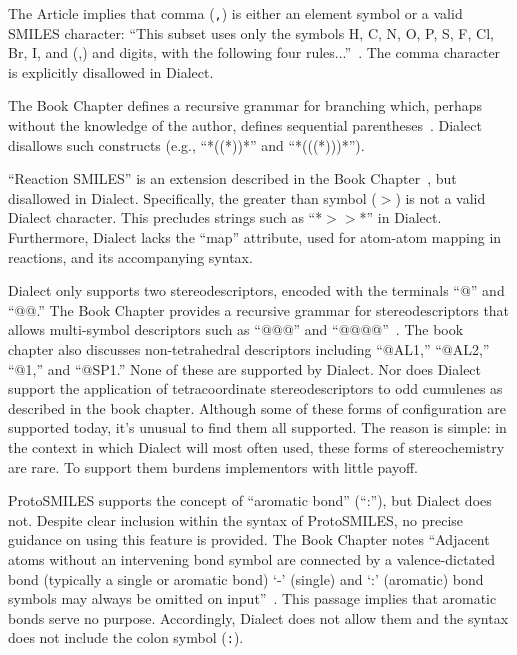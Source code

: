 \documentclass{article}
\def\ttt{\texttt}
\begin{document}
The Article implies that comma (\ttt{,}) is either an element symbol or a valid SMILES character: \enquote{This subset uses only the symbols H, C, N, O, P, S, F, Cl, Br, I, and (,) and digits, with the following four rules...}~\cite[p.~33]{weininger:1988}. The comma character is explicitly disallowed in Dialect.

The Book Chapter defines a recursive grammar for branching which, perhaps without the knowledge of the author, defines sequential parentheses~\cite[p.~86]{weininger:2003}. Dialect disallows such constructs (e.g., \enquote{*((*))*} and \enquote{*(((*)))*}).

\enquote{Reaction SMILES} is an extension described in the Book Chapter~\cite[p.~89]{weininger:2003}, but disallowed in Dialect. Specifically, the greater than symbol (\ttt{$>$}) is not a valid Dialect character. This precludes strings such as \enquote{*$>$$>$*} in Dialect. Furthermore, Dialect lacks the \enquote{map} attribute, used for atom-atom mapping in reactions, and its accompanying syntax.

Dialect only supports two stereodescriptors, encoded with the terminals \enquote{@} and \enquote{@@.} The Book Chapter provides a recursive grammar for stereodescriptors that allows multi-symbol descriptors such as \enquote{@@@} and \enquote{@@@@}~\cite[p.~94]{weininger:2003}. The book chapter also discusses non-tetrahedral descriptors including \enquote{@AL1,} \enquote{@AL2,} \enquote{@1,} and \enquote{@SP1.} None of these are supported by Dialect. Nor does Dialect support the application of tetracoordinate stereodescriptors to odd cumulenes as described in the book chapter. Although some of these forms of configuration are supported today, it's unusual to find them all supported. The reason is simple: in the context in which Dialect will most often used, these forms of stereochemistry are rare. To support them burdens implementors with little payoff.

ProtoSMILES supports the concept of \enquote{aromatic bond} (\enquote{:}), but Dialect does not. Despite clear inclusion within the syntax of ProtoSMILES, no precise guidance on using this feature is provided. The Book Chapter notes \enquote{Adjacent atoms without an intervening bond symbol are connected by a valence-dictated bond (typically a single or aromatic bond) \enquote{-} (single) and \enquote{:} (aromatic) bond symbols may always be omitted on input}~\cite[p.~85]{weininger:2003}. This passage implies that aromatic bonds serve no purpose. Accordingly, Dialect does not allow them and the syntax does not include the colon symbol (\ttt{:}).
\end{document}

